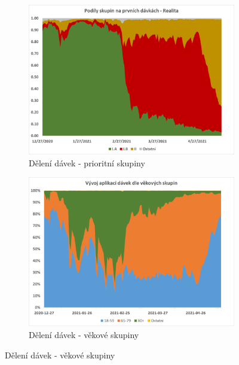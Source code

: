 \begin{figure}
\begin{subfigure}{0.45\textwidth}
\includegraphics[width=\textwidth]{assets/theta_real}
\caption{Dělení dávek - prioritní skupiny}
\label{gr_real_theta}
\end{subfigure}
%
\begin{subfigure}{0.45\textwidth}
\includegraphics[width=\textwidth]{assets/chart_vek}
\caption{Dělení dávek - věkové skupiny}
\label{gr_skupiny_davky_vek}
\end{subfigure}



\end{figure}
